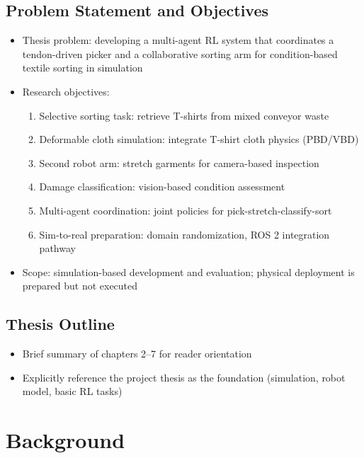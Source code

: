\section{Problem Statement and Objectives}
\begin{itemize}
    \item Thesis problem: developing a multi-agent RL system that coordinates a tendon-driven picker and a collaborative sorting arm for condition-based textile sorting in simulation
    \item Research objectives:
    \begin{enumerate}
        \item Selective sorting task: retrieve T-shirts from mixed conveyor waste
        \item Deformable cloth simulation: integrate T-shirt cloth physics (PBD/VBD)
        \item Second robot arm: stretch garments for camera-based inspection
        \item Damage classification: vision-based condition assessment
        \item Multi-agent coordination: joint policies for pick-stretch-classify-sort
        \item Sim-to-real preparation: domain randomization, ROS 2 integration pathway
    \end{enumerate}
    \item Scope: simulation-based development and evaluation; physical deployment is prepared but not executed
\end{itemize}

\section{Thesis Outline}
\begin{itemize}
    \item Brief summary of chapters 2--7 for reader orientation
    \item Explicitly reference the project thesis as the foundation (simulation, robot model, basic RL tasks)
\end{itemize}

\chapter{Background}\label{ch:background}

